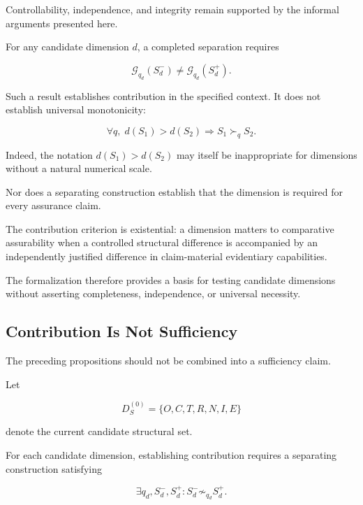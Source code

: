 Controllability, independence, and integrity remain supported
by the informal arguments presented here.

For any candidate dimension \(d\), a completed separation requires

\begin{equation}
  \mathcal{G}_{q_d}(S_d^{-})
  \neq
  \mathcal{G}_{q_d}(S_d^{+}).
  \label{eq:all-dimensions-separate}
\end{equation}

Such a result establishes contribution in the specified context.
It does not establish universal monotonicity:

\begin{equation}
  \forall q,\;
  d(S_1)>d(S_2)
  \Rightarrow
  S_1\succ_q S_2.
  \label{eq:no-universal-monotonicity}
\end{equation}

Indeed, the notation \(d(S_1)>d(S_2)\) may itself be
inappropriate for dimensions without a natural numerical scale.

Nor does a separating construction establish that the dimension
is required for every assurance claim.

The contribution criterion is existential: a dimension matters
to comparative assurability when a controlled structural difference
is accompanied by an independently justified difference in
claim-material evidentiary capabilities.

The formalization therefore provides a basis for testing
candidate dimensions without asserting completeness,
independence, or universal necessity.

\subsection{Contribution Is Not Sufficiency}
\label{aa.subsec.formal-non-sufficiency}

The preceding propositions should not be combined into a sufficiency claim.

Let

\begin{equation}
  D_S^{(0)}
  =
  \{
  O,C,T,R,N,I,E
  \}
\end{equation}

denote the current candidate structural set.

For each candidate dimension, establishing contribution requires
a separating construction satisfying

\begin{equation}
  \exists q_d,S_d^{-},S_d^{+}
  :
  S_d^{-}
  \not\sim_{q_d}
  S_d^{+}.
\end{equation}

